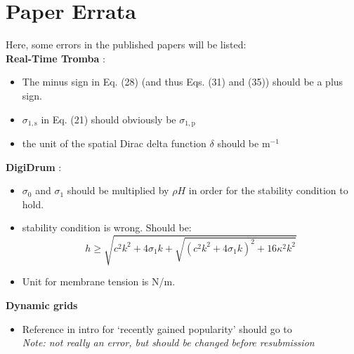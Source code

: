 \chapter*{Paper Errata}
Here, some errors in the published papers will be listed:
\\
\textbf{Real-Time Tromba \citeP[D]}: 
\begin{itemize}
    \item The minus sign in Eq. (28) (and thus Eqs. (31) and (35)) should be a plus sign.
    \item $\sigma_{1,\text{s}}$ in Eq. (21) should obviously be $\sigma_{1,\text{p}}$
    \item the unit of the spatial Dirac delta function $\delta$ should be m$^{-1}$
\end{itemize}
%
\textbf{DigiDrum \citeP[F]}: 
\begin{itemize}
    \item $\sigma_0$ and $\sigma_1$ should be multiplied by $\rho H$ in order for the stability condition to hold.
    \item stability condition is wrong. Should be: 
    \begin{equation}
        h \geq \sqrt{c^2k^2 + 4\sigma_1k + \sqrt{(c^2k^2+4\sigma_1k)^2 + 16\kappa^2k^2}}
    \end{equation}
    \item Unit for membrane tension is N/m.
\end{itemize}
%
\textbf{Dynamic grids \citeP[G]}
\begin{itemize}
    \item Reference in intro for `recently gained popularity' should go to \cite{Bilbao2019CMJa} \\
    \textit{Note: not really an error, but should be changed before resubmission}
\end{itemize}
